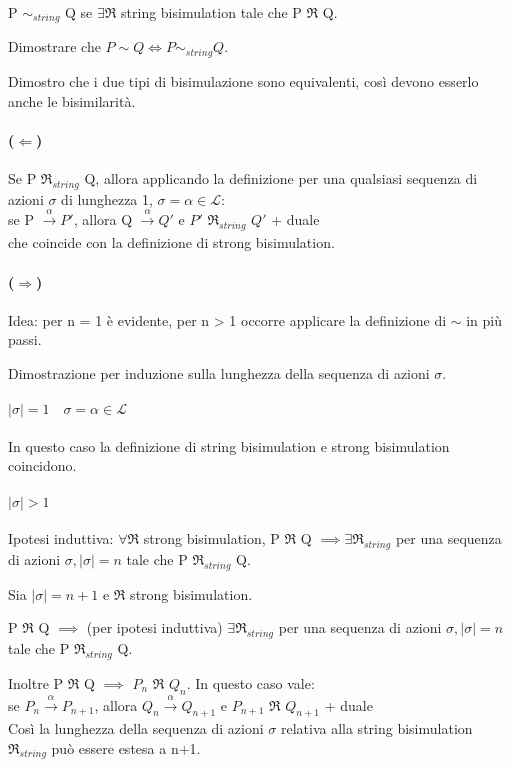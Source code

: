 P $\sim_{string}$ Q se $\exists \Re$ string bisimulation tale che P $\Re$ Q.

Dimostrare che $P \sim Q \Leftrightarrow P \sim_{string} Q $.

Dimostro che i due tipi di bisimulazione sono equivalenti, così devono esserlo anche le bisimilarità.

\paragraph{($\Longleftarrow$)}

Se P $\Re_{string}$ Q, allora applicando la definizione per una qualsiasi sequenza di azioni $\sigma$ di lunghezza 1, $\sigma = \alpha \in \mathcal{L}:$ \\

se P $\xrightarrow[]{\alpha} P'$, allora Q $\xrightarrow[]{\alpha} Q'$ e $P'$ $\Re_{string}$ $Q'$ + duale \\

che coincide con la definizione di strong bisimulation.

\paragraph{($\Longrightarrow$)}

Idea: per n = 1 è evidente, per n > 1 occorre applicare la definizione di $\sim$ in più passi.

Dimostrazione per induzione sulla lunghezza della sequenza di azioni $\sigma$.

\paragraph{$|\sigma| = 1 \quad \sigma = \alpha \in \mathcal{L}$}

In questo caso la definizione di string bisimulation e strong bisimulation coincidono.

\paragraph{$|\sigma| > 1$}

Ipotesi induttiva: $\forall \Re$ strong bisimulation, P $\Re$ Q $\implies \exists \Re_{string}$ per una sequenza di azioni $\sigma,
|\sigma| = n$ tale che P $\Re_{string}$ Q.

Sia $|\sigma| = n + 1$ e $\Re$ strong bisimulation.

P $\Re$ Q $\implies$ (per ipotesi induttiva) $\exists \Re_{string}$ per una sequenza di azioni $\sigma,
|\sigma| = n$ tale che P $\Re_{string}$ Q.

Inoltre P $\Re$ Q $\implies$ $P_n$ $\Re$ $Q_n$. In questo caso vale: \\

se $P_n \xrightarrow[]{\alpha} P_{n+1}$, allora $Q_n \xrightarrow[]{\alpha} Q_{n+1}$ e $P_{n+1}$ $\Re$ $Q_{n+1}$ + duale \\

Così la lunghezza della sequenza di azioni $\sigma$ relativa alla string bisimulation $\Re_{string}$ può essere estesa a n+1.
